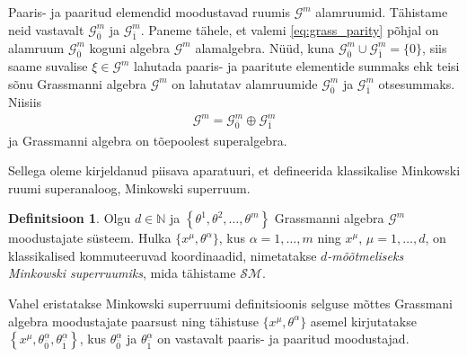 \documentclass[12pt,a4paper,oneside]{article}
\theoremstyle{plain}
\theoremstyle{definition}
\newtheorem{definitsioon}{Definitsioon}[section]
\numberwithin{equation}{section}
\def\N{{\mathbb N}}
\def\G{{\mathcal G}}
\def\SM{{\mathcal {SM}}}
\begin{document}
Paaris- ja paaritud elemendid moodustavad ruumis $\G^m$ alamruumid. 
Tähistame neid vastavalt $\G^{m}_{\overline{0}}$ ja 
$\G^{m}_{\overline{1}}$. Paneme tähele, et valemi
\ref{eq:grass_parity} põhjal on alamruum $\G^{m}_{\overline{0}}$ 
koguni algebra $\G^m$ alamalgebra. Nüüd, kuna 
$\G^{m}_{\overline{0}} \cup \G^{m}_{\overline{1}} = \{0\}$, siis 
saame suvalise $\xi \in \G^m$ lahutada paaris- ja paaritute 
elementide summaks ehk teisi sõnu Grassmanni algebra $\G^m$ on 
lahutatav alamruumide $\G^{m}_{\overline{0}}$ ja 
$\G^{m}_{\overline{1}}$ otsesummaks. Niisiis 
\begin{align*}
\G^m = \G^{m}_{\overline{0}} \oplus \G^{m}_{\overline{1}}
\end{align*}
ja Grassmanni algebra on tõepoolest superalgebra.

Sellega oleme kirjeldanud piisava aparatuuri, et defineerida
klassikalise Minkowski ruumi superanaloog, Minkowski superruum. 

\begin{definitsioon}
Olgu $d \in \N$ ja 
$\left\lbrace\theta^1, \theta^2, \ldots, \theta^m\right\rbrace$
Grassmanni algebra $\G^m$ moodustajate süsteem. 
Hulka $\{x^{\mu}, \theta^\alpha\}$, kus $\alpha = 1, \ldots, m$ ning 
$x^{\mu}$, $\mu = 1, \ldots, d$, on klassikalised kommuteeruvad 
koordinaadid, nimetatakse \emph{$d$-mõõtmeliseks Minkowski 
superruumiks}, mida tähistame $\SM$.
\end{definitsioon}

Vahel eristatakse Minkowski superruumi definitsioonis
selguse mõttes Grassmani algebra moodustajate paarsust ning 
tähistuse $\{x^{\mu}, \theta^\alpha\}$ asemel kirjutatakse 
$\left\lbrace x^{\mu}, \theta_{\overline{0}}^{\alpha}, 
\theta_{\overline{1}}^{\alpha} \right\rbrace$, kus 
$\theta_{\overline{0}}^{\alpha}$ 
ja $\theta_{\overline{1}}^{\alpha}$ on vastavalt paaris- ja paaritud 
moodustajad.
\end{document}
